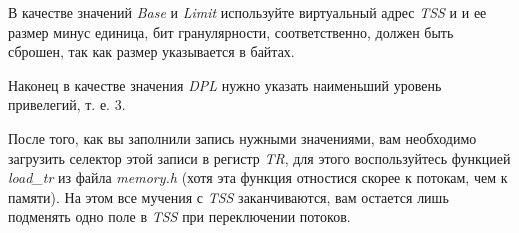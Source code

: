 В качестве значений \emph{Base} и \emph{Limit} используйте виртуальный адрес
\emph{TSS} и и ее размер минус единица, бит гранулярности, соответственно, должен
быть сброшен, так как размер указывается в байтах.

Наконец в качестве значения \emph{DPL} нужно указать наименьший уровень привелегий,
т. е. 3.

После того, как вы заполнили запись нужными значениями, вам необходимо загрузить
селектор этой записи в регистр \emph{TR}, для этого воспользуйтесь функцией
\emph{load\_tr} из файла \emph{memory.h} (хотя эта функция отностися скорее к
потокам, чем к памяти). На этом все мучения с \emph{TSS} заканчиваются, вам остается
лишь подменять одно поле в \emph{TSS} при переключении потоков.
